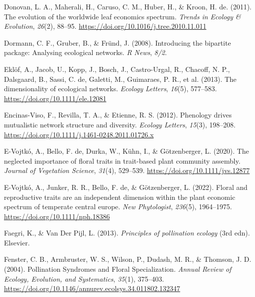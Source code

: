 \documentclass[
  12pt,
  a4paper,
]{article}
\newlength{\cslhangindent}
\newlength{\cslentryspacingunit} %
\newenvironment{CSLReferences}[2] %
 {%
  \setlength{\parindent}{0pt}
  \ifodd #1
  \let\oldpar\par
  \def\par{\hangindent=\cslhangindent\oldpar}
  \fi
  \setlength{\parskip}{#2\cslentryspacingunit}
 }%
 {}
\begin{document}
\begin{CSLReferences}{1}{0}
\leavevmode{}%
Donovan, L. A., Maherali, H., Caruso, C. M., Huber, H., \& Kroon, H. de. (2011). The evolution of the worldwide leaf economics spectrum. \emph{Trends in Ecology \& Evolution}, \emph{26}(2), 88--95. \url{https://doi.org/10.1016/j.tree.2010.11.011}

\leavevmode{}%
Dormann, C. F., Gruber, B., \& Fründ, J. (2008). Introducing the bipartite package: Analysing ecological networks. \emph{R News}, \emph{8/2}.

\leavevmode{}%
Eklöf, A., Jacob, U., Kopp, J., Bosch, J., Castro-Urgal, R., Chacoff, N. P., Dalsgaard, B., Sassi, C. de, Galetti, M., Guimaraes, P. R., et al. (2013). The dimensionality of ecological networks. \emph{Ecology Letters}, \emph{16}(5), 577--583. \url{https://doi.org/10.1111/ele.12081}

\leavevmode{}%
Encinas-Viso, F., Revilla, T. A., \& Etienne, R. S. (2012). Phenology drives mutualistic network structure and diversity. \emph{Ecology Letters}, \emph{15}(3), 198--208. \url{https://doi.org/10.1111/j.1461-0248.2011.01726.x}

\leavevmode{}%
E-Vojtkó, A., Bello, F. de, Durka, W., Kühn, I., \& Götzenberger, L. (2020). The neglected importance of floral traits in trait-based plant community assembly. \emph{Journal of Vegetation Science}, \emph{31}(4), 529--539. \url{https://doi.org/10.1111/jvs.12877}

\leavevmode{}%
E-Vojtkó, A., Junker, R. R., Bello, F. de, \& Götzenberger, L. (2022). Floral and reproductive traits are an independent dimension within the plant economic spectrum of temperate central europe. \emph{New Phytologist}, \emph{236}(5), 1964--1975. \url{https://doi.org/10.1111/nph.18386}

\leavevmode{}%
Faegri, K., \& Van Der Pijl, L. (2013). \emph{Principles of pollination ecology} ({3rd edn}). {Elsevier}.

\leavevmode{}%
Fenster, C. B., Armbruster, W. S., Wilson, P., Dudash, M. R., \& Thomson, J. D. (2004). Pollination {Syndromes} and {Floral Specialization}. \emph{Annual Review of Ecology, Evolution, and Systematics}, \emph{35}(1), 375--403. \url{https://doi.org/10.1146/annurev.ecolsys.34.011802.132347}


\end{CSLReferences}
\end{document}
